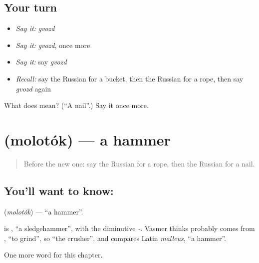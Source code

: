 \subsection*{Your turn}
\begin{itemize}
\raggedright
  \item \emph{Say it:} \emph{gvozd}
  \item \emph{Say it:} \emph{gvozd}, once more
  \item \emph{Say it:} say \emph{gvozd}
  \item \emph{Recall:} say the Russian for a bucket, then the Russian for a rope, then say \emph{gvozd} again
\end{itemize}

\begin{tcolorbox}[breakable,colback=teal!4,colframe=teal!35!black,title={Before you move on}]
What does  mean? (\textquotedblleft{}A nail\textquotedblright{}.) Say it once more.
\end{tcolorbox}
\section[\texorpdfstring{\ru{молоток} (molotók)}{молоток (molotók)}]{ (molotók) — a hammer}

\label{lesson:RU-C98-hammer}



\begin{quote}
Before the new one: say the Russian for a rope, then the Russian for a nail.
\end{quote}

\subsection*{You'll want to know: }
\textbf{} (\emph{molotók}) — \textquotedblleft{}a hammer\textquotedblright{}.

\begin{cousinweb}
\textbf{} is \emph{}, \textquotedblleft{}a sledgehammer\textquotedblright{}, with the diminutive \emph{-}. Vasmer thinks \emph{} probably comes from \emph{}, \textquotedblleft{}to grind\textquotedblright{}, so \textquotedblleft{}the crusher\textquotedblright{}, and compares Latin \emph{malleus}, \textquotedblleft{}a hammer\textquotedblright{}.
\end{cousinweb}

\begin{grammarlens}[title={What you've built}]
One more word for this chapter.
\end{grammarlens}

